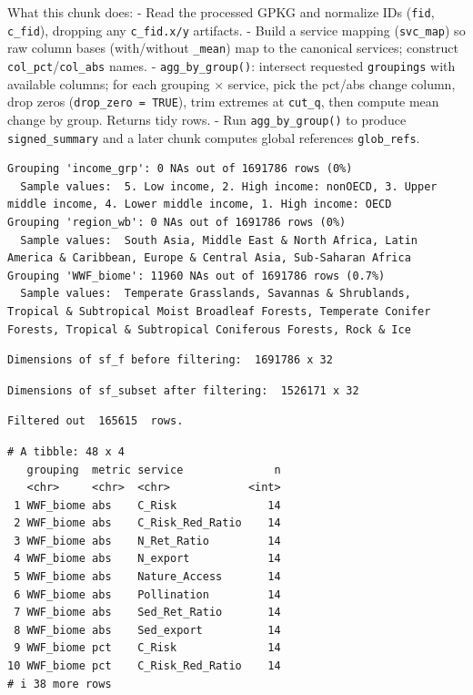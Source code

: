 \documentclass[
  letterpaper,
  DIV=11,
  numbers=noendperiod]{scrartcl}
\begin{document}
What this chunk does: - Read the processed GPKG and normalize IDs
(\texttt{fid}, \texttt{c\_fid}), dropping any \texttt{c\_fid.x/y}
artifacts. - Build a service mapping (\texttt{svc\_map}) so raw column
bases (with/without \texttt{\_mean}) map to the canonical services;
construct \texttt{col\_pct}/\texttt{col\_abs} names. -
\texttt{agg\_by\_group()}: intersect requested \texttt{groupings} with
available columns; for each grouping × service, pick the pct/abs change
column, drop zeros (\texttt{drop\_zero\ =\ TRUE}), trim extremes at
\texttt{cut\_q}, then compute mean change by group. Returns tidy rows. -
Run \texttt{agg\_by\_group()} to produce \texttt{signed\_summary} and a
later chunk computes global references \texttt{glob\_refs}.

\begin{verbatim}
Grouping 'income_grp': 0 NAs out of 1691786 rows (0%)
  Sample values:  5. Low income, 2. High income: nonOECD, 3. Upper middle income, 4. Lower middle income, 1. High income: OECD 
Grouping 'region_wb': 0 NAs out of 1691786 rows (0%)
  Sample values:  South Asia, Middle East & North Africa, Latin America & Caribbean, Europe & Central Asia, Sub-Saharan Africa 
Grouping 'WWF_biome': 11960 NAs out of 1691786 rows (0.7%)
  Sample values:  Temperate Grasslands, Savannas & Shrublands, Tropical & Subtropical Moist Broadleaf Forests, Temperate Conifer Forests, Tropical & Subtropical Coniferous Forests, Rock & Ice 
\end{verbatim}

\begin{verbatim}
Dimensions of sf_f before filtering:  1691786 x 32 
\end{verbatim}

\begin{verbatim}
Dimensions of sf_subset after filtering:  1526171 x 32 
\end{verbatim}

\begin{verbatim}
Filtered out  165615  rows.
\end{verbatim}

\begin{verbatim}
# A tibble: 48 x 4
   grouping  metric service              n
   <chr>     <chr>  <chr>            <int>
 1 WWF_biome abs    C_Risk              14
 2 WWF_biome abs    C_Risk_Red_Ratio    14
 3 WWF_biome abs    N_Ret_Ratio         14
 4 WWF_biome abs    N_export            14
 5 WWF_biome abs    Nature_Access       14
 6 WWF_biome abs    Pollination         14
 7 WWF_biome abs    Sed_Ret_Ratio       14
 8 WWF_biome abs    Sed_export          14
 9 WWF_biome pct    C_Risk              14
10 WWF_biome pct    C_Risk_Red_Ratio    14
# i 38 more rows
\end{verbatim}
\end{document}
